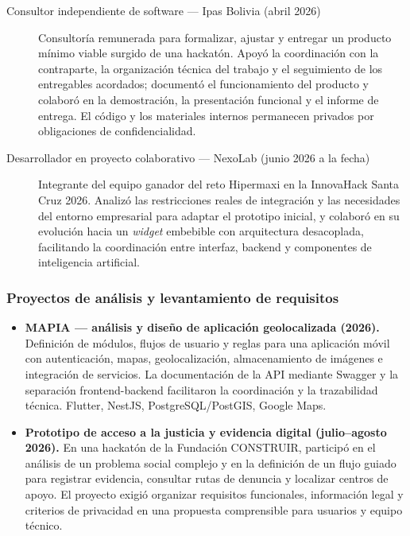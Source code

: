 \begin{description}
  \item[Consultor independiente de software — Ipas Bolivia (abril 2026)]
  Consultoría remunerada para formalizar, ajustar y entregar un producto mínimo
  viable surgido de una hackatón. Apoyó la coordinación con la contraparte, la
  organización técnica del trabajo y el seguimiento de los entregables acordados;
  documentó el funcionamiento del producto y colaboró en la demostración, la
  presentación funcional y el informe de entrega. El código y los materiales
  internos permanecen privados por obligaciones de confidencialidad.

  \item[Desarrollador en proyecto colaborativo — NexoLab (junio 2026 a la fecha)]
  Integrante del equipo ganador del reto Hipermaxi en la InnovaHack Santa Cruz
  2026. Analizó las restricciones reales de integración y las necesidades del
  entorno empresarial para adaptar el prototipo inicial, y colaboró en su
  evolución hacia un \emph{widget} embebible con arquitectura desacoplada,
  facilitando la coordinación entre interfaz, backend y componentes de
  inteligencia artificial.
\end{description}

\subsubsection{Proyectos de análisis y levantamiento de requisitos}

\begin{itemize}
  \item \textbf{MAPIA — análisis y diseño de aplicación geolocalizada (2026).}
        Definición de módulos, flujos de usuario y reglas para una aplicación
        móvil con autenticación, mapas, geolocalización, almacenamiento de
        imágenes e integración de servicios. La documentación de la API mediante
        Swagger y la separación frontend-backend facilitaron la coordinación y la
        trazabilidad técnica. Flutter, NestJS, PostgreSQL/PostGIS, Google Maps.
  \item \textbf{Prototipo de acceso a la justicia y evidencia digital
        (julio–agosto 2026).} En una hackatón de la Fundación CONSTRUIR,
        participó en el análisis de un problema social complejo y en la
        definición de un flujo guiado para registrar evidencia, consultar rutas
        de denuncia y localizar centros de apoyo. El proyecto exigió organizar
        requisitos funcionales, información legal y criterios de privacidad en
        una propuesta comprensible para usuarios y equipo técnico.
\end{itemize}

